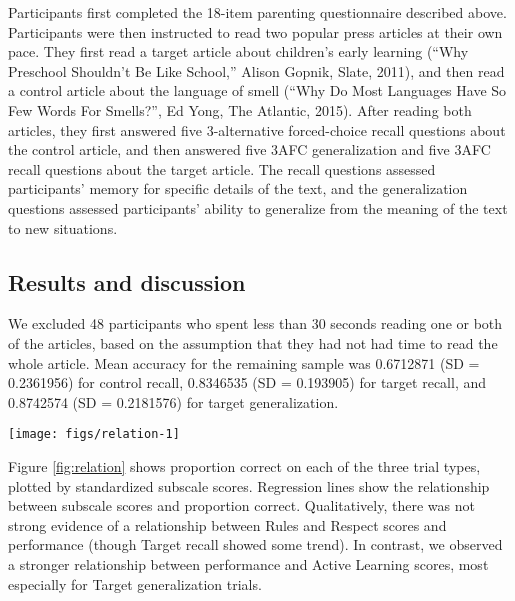 \documentclass[10pt, letterpaper]{article}
\newenvironment{CodeChunk}{}{}
\begin{document}
Participants first completed the 18-item parenting questionnaire
described above. Participants were then instructed to read two popular
press articles at their own pace. They first read a target article about
children's early learning (``Why Preschool Shouldn't Be Like School,''
Alison Gopnik, Slate, 2011), and then read a control article about the
language of smell (``Why Do Most Languages Have So Few Words For
Smells?'', Ed Yong, The Atlantic, 2015). After reading both articles,
they first answered five 3-alternative forced-choice recall questions
about the control article, and then answered five 3AFC generalization
and five 3AFC recall questions about the target article. The recall
questions assessed participants' memory for specific details of the
text, and the generalization questions assessed participants' ability to
generalize from the meaning of the text to new situations.

\subsection{Results and discussion}\label{results-and-discussion}

We excluded 48 participants who spent less than 30 seconds reading one
or both of the articles, based on the assumption that they had not had
time to read the whole article. Mean accuracy for the remaining sample
was 0.6712871 (SD = 0.2361956) for control recall, 0.8346535 (SD =
0.193905) for target recall, and 0.8742574 (SD = 0.2181576) for target
generalization.

\begin{CodeChunk}
\begin{figure*}[!h]

{\centering \texttt{[image: figs/relation-1]} 

}

\caption[Relationship between subscale scores and uptake of articles]{Relationship between subscale scores and uptake of articles.}\label{fig:relation}
\end{figure*}
\end{CodeChunk}

Figure \ref{fig:relation} shows proportion correct on each of the three
trial types, plotted by standardized subscale scores. Regression lines
show the relationship between subscale scores and proportion correct.
Qualitatively, there was not strong evidence of a relationship between
Rules and Respect scores and performance (though Target recall showed
some trend). In contrast, we observed a stronger relationship between
performance and Active Learning scores, most especially for Target
generalization trials.
\end{document}
